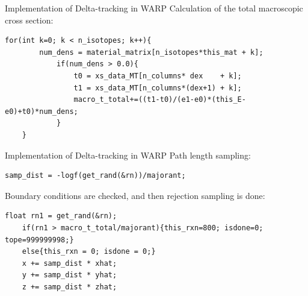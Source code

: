 \documentclass[xcolor=x11names, compress]{beamer}
\renewcommand{\(}{\begin{columns}}
\renewcommand{\)}{\end{columns}}
\newcommand{\<}[1]{\begin{column}{#1}}
\renewcommand{\>}{\end{column}}
\begin{document}
\begin{frame}[fragile]{Implementation of Delta-tracking in WARP}
	Calculation of the total macroscopic cross section:
	\vspace{5 mm}
	\pause
	\begin{Verbatim}[fontsize=\footnotesize]
	for(int k=0; k < n_isotopes; k++){
	    num_dens = material_matrix[n_isotopes*this_mat + k];
	        if(num_dens > 0.0){
	            t0 = xs_data_MT[n_columns* dex    + k];
	            t1 = xs_data_MT[n_columns*(dex+1) + k];
	            macro_t_total+=((t1-t0)/(e1-e0)*(this_E-e0)+t0)*num_dens;
	        }
	}
	\end{Verbatim}
\end{frame}


\begin{frame}[fragile]{Implementation of Delta-tracking in WARP}
	Path length sampling:
	\vspace{2 mm}
	\pause
	\begin{Verbatim}[fontsize=\footnotesize]
	samp_dist = -logf(get_rand(&rn))/majorant;
	\end{Verbatim}
	\pause
	\vspace{2 mm}
	Boundary conditions are checked, and then rejection sampling is done:
	\pause
	\vspace{2 mm}
	\begin{Verbatim}[fontsize=\footnotesize]
	float rn1 = get_rand(&rn);
	if(rn1 > macro_t_total/majorant){this_rxn=800; isdone=0; tope=999999998;}
	else{this_rxn = 0; isdone = 0;}
	x += samp_dist * xhat;
	y += samp_dist * yhat;
	z += samp_dist * zhat;
	\end{Verbatim}
\end{frame}
\end{document}
